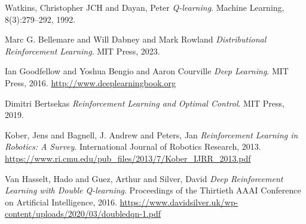 \begin{thebibliography}{99}
Watkins, Christopher JCH and Dayan, Peter \textit{Q-learning}. Machine Learning, 8(3):279--292, 1992.




Marc G. Bellemare and Will Dabney and Mark Rowland \textit{Distributional Reinforcement Learning}. MIT Press, 2023.


Ian Goodfellow and Yoshua Bengio and Aaron Courville \textit{Deep Learning}. MIT Press, 2016. \url{http://www.deeplearningbook.org}

Dimitri Bertsekas \textit{Reinforcement Learning and Optimal Control}. MIT Press, 2019.



Kober, Jens and Bagnell, J. Andrew and Peters, Jan \textit{Reinforcement Learning in Robotics: A Survey}. International Journal of Robotics Research, 2013. \url{https://www.ri.cmu.edu/pub_files/2013/7/Kober_IJRR_2013.pdf}

Van Hasselt, Hado and Guez, Arthur and Silver, David \textit{Deep Reinforcement Learning with Double Q-learning}. Proceedings of the Thirtieth AAAI Conference on Artificial Intelligence, 2016. \url{https://www.davidsilver.uk/wp-content/uploads/2020/03/doubledqn-1.pdf}




\end{thebibliography}